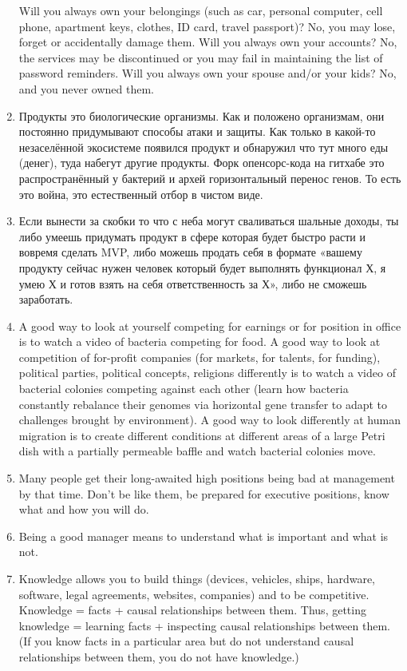 \documentclass[11pt]{article}
\theoremstyle{remark}
\theoremstyle{definition}
\begin{document}
\begin{enumerate}
Will you always own your belongings (such as car, personal computer, cell phone, apartment keys, clothes, ID card, travel passport)? No, you may lose, forget or accidentally damage them. Will you always own your accounts? No, the services may be discontinued or you may fail in maintaining the list of password reminders. Will you always own your spouse and/or your kids? No, and you never owned them.

\item Продукты это биологические организмы. Как и положено организмам, они постоянно придумывают способы атаки и защиты. Как только в какой-то незаселённой экосистеме появился продукт и обнаружил что тут много еды (денег), туда набегут другие продукты. Форк опенсорс-кода на гитхабе это распространённый у бактерий и архей горизонтальный перенос генов. То есть это война, это естественный отбор в чистом виде.


\item Если вынести за скобки то что с неба могут сваливаться шальные доходы, ты либо умеешь придумать продукт в сфере которая будет быстро расти и вовремя сделать MVP, либо можешь продать себя в формате «вашему продукту сейчас нужен человек который будет выполнять функционал Х, я умею Х и готов взять на себя ответственность за Х», либо не сможешь заработать. 


\item A good way to look at yourself competing for earnings or for position in office is to watch a video of bacteria competing for food. A good way to look at competition of for-profit companies (for markets, for talents, for funding), political parties, political concepts, religions differently is to watch a video of bacterial colonies competing against each other (learn how bacteria constantly rebalance their genomes via horizontal gene transfer to adapt to challenges brought by environment). A good way to look differently at human migration is to create different conditions at different areas of a large Petri dish with a partially permeable baffle and watch bacterial colonies move.

\item Many people get their long-awaited high positions being bad at management by that time. Don't be like them, be prepared for executive positions, know what and how you will do.


\item Being a good manager means to understand what is important and what is not.

\item Knowledge allows you to build things (devices, vehicles, ships, hardware, software, legal agreements, websites, companies) and to be competitive. Knowledge = facts + causal relationships between them. Thus, getting knowledge = learning facts + inspecting causal relationships between them. (If you know facts in a particular area but do not understand causal relationships between them, you do not have knowledge.)


\end{enumerate}
\end{document}
